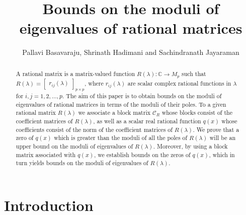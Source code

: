 \documentclass[12pt, reqno]{amsart}
\theoremstyle{definition}
\theoremstyle{remark}
\numberwithin{equation}{section}
\begin{document}
\setcounter{page}{1}

\title[Eigenvalue bounds]
{Bounds on the moduli of eigenvalues of rational matrices}
	
\author[Pallavi, Shrinath and Sachindranath]{Pallavi Basavaraju, Shrinath Hadimani 
and Sachindranath Jayaraman}
\address{School of Mathematics\\ 
Indian Institute of Science Education and Research Thiruvananthapuram\\ 
Maruthamala P.O., Vithura, Thiruvananthapuram -- 695 551, Kerala, India.}
	
	
	
	
\begin{abstract} 
A rational matrix is a matrix-valued function 
$R(\lambda): \mathbb{C} \rightarrow M_p$ such that $R(\lambda) = \begin{bmatrix}
r_{ij}(\lambda)
\end{bmatrix} _{p\times p}$, where $r_{ij}(\lambda)$ are scalar complex rational 
functions in $\lambda$ for $i,j=1,2,\ldots,p$. The aim of this paper is to 
obtain bounds on the moduli of eigenvalues of rational matrices in terms of 
the moduli of their poles. To a given rational matrix $R(\lambda)$ we associate a 
block matrix $\mathcal{C}_R$ whose blocks consist of the coefficient matrices of 
$R(\lambda)$, as well as a scalar real rational function $q(x)$ whose coefficients 
consist of the norm of the coefficient matrices of $R(\lambda)$. We prove 
that a zero of $q(x)$ which is greater than the moduli 
of all the poles of $R(\lambda)$ will be an upper bound on the moduli of 
eigenvalues of $R(\lambda)$. Moreover, by using a block matrix associated with 
$q(x)$, we establish bounds on the zeros of $q(x)$, which in turn yields  
bounds on the moduli of eigenvalues of $R(\lambda)$. 
\end{abstract}
	
\maketitle
	
\section{Introduction}\label{sec-1}
\end{document}
